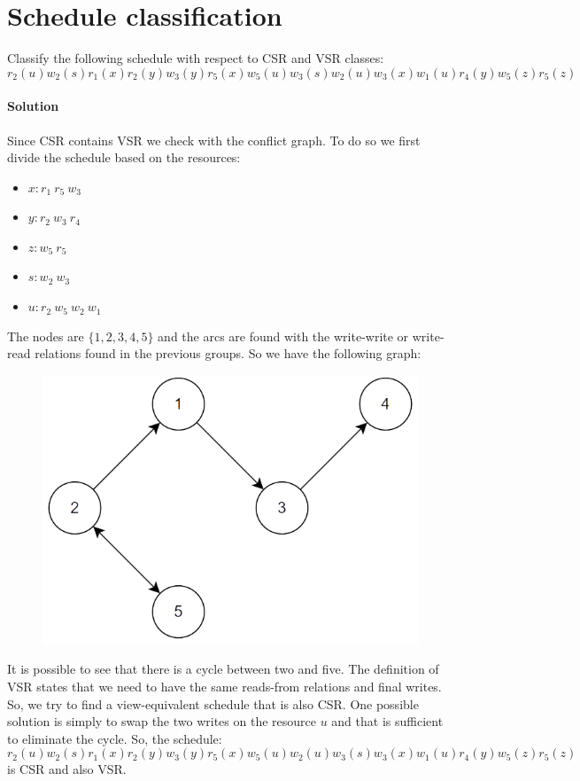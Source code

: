 \section{Schedule classification}
Classify the following schedule with respect to CSR and VSR classes:  
\[r_2(u) w_2(s) r_1(x) r_2(y) w_3(y) r_5(x) w_5(u) w_3(s)w_2(u) w_3(x) w_1(u) r_4(y) w_5(z) r_5(z)\]

\paragraph*{Solution}
Since CSR contains VSR we check with the conflict graph. To do so we first divide the schedule based on the resources: 
\begin{itemize}
    \item $x: r_1 \: r_5 \:w_3$
    \item $y: r_2 \: w_3 \:r_4$
    \item $z: w_5 \: r_5$
    \item $s: w_2 \: w_3$
    \item $u: r_2 \: w_5 \: w_2 \:w_1$
\end{itemize}
The nodes are $\{1,2,3,4,5\}$ and the arcs are found with the write-write or write-read relations found in the previous groups. So we have the following graph:
\begin{figure}[H]
    \centering
    \includegraphics[width=0.5\linewidth]{images/conflictgraph1.png}
\end{figure}
It is possible to see that there is a cycle between two and five. The definition of VSR states that we need to have the same reads-from relations and final writes. So, we try to find a view-equivalent 
schedule that is also CSR. One possible solution is simply to swap the two writes on the resource $u$ and that is sufficient to eliminate the cycle. So, the schedule: 
\[r_2(u) w_2(s) r_1(x) r_2(y) w_3(y) r_5(x) w_5(u) w_2(u) w_3(s) w_3(x) w_1(u) r_4(y) w_5(z) r_5(z)\]
is CSR and also VSR. 